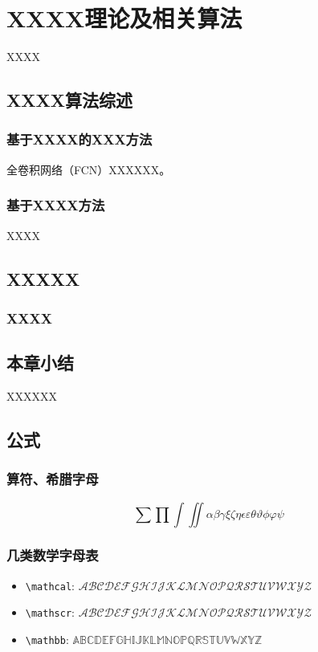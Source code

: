 \chapter{XXXX理论及相关算法}
XXXX

\section{XXXX算法综述}
\subsection{基于XXXX的XXX方法}
全卷积网络（FCN）\cite{fcn}XXXXXX。

\subsection{基于XXXX方法}
XXXX


\section{XXXXX}
\subsection{XXXX}

\section{本章小结}
XXXXXX


\section{公式}

\subsection{算符、希腊字母}

\[\sum\prod\int\iint\alpha\beta\gamma\xi\zeta\eta\epsilon\varepsilon\theta\vartheta
  \phi\varphi\psi\]


\subsection{几类数学字母表}

\begin{itemize}
  \item \verb|\mathcal|: $\mathcal{ABCDEFGHIJKLMNOPQRSTUVWXYZ}$
  \item \verb|\mathscr|: $\mathscr{ABCDEFGHIJKLMNOPQRSTUVWXYZ}$
  \item \verb|\mathbb|: $\mathbb{ABCDEFGHIJKLMNOPQRSTUVWXYZ}$
\end{itemize}


